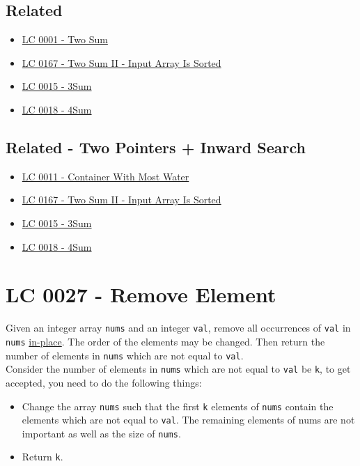 \subsection*{Related}
\begin{itemize}
\item \hyperref[lc0001]{LC 0001 - Two Sum}
\item \hyperref[lc0167]{LC 0167 - Two Sum II - Input Array Is Sorted}
\item \hyperref[lc0015]{LC 0015 - 3Sum}
\item \hyperref[lc0018]{LC 0018 - 4Sum}
\end{itemize}

\subsection*{Related - Two Pointers + Inward Search}
\begin{itemize}
\item \hyperref[lc0011]{LC 0011 - Container With Most Water}
\item \hyperref[lc0167]{LC 0167 - Two Sum II - Input Array Is Sorted}
\item \hyperref[lc0015]{LC 0015 - 3Sum}
\item \hyperref[lc0018]{LC 0018 - 4Sum}
\end{itemize}

\section{LC 0027 - Remove Element}\label{lc0027}
Given an integer array {\colorbox{CodeBackground}{\lstinline|nums|}} and an integer {\colorbox{CodeBackground}{\lstinline|val|}}, remove all occurrences of {\colorbox{CodeBackground}{\lstinline|val|}} in {\colorbox{CodeBackground}{\lstinline|nums|}} \ul{in-place}. The order of the elements may be changed. Then return the number of elements in {\colorbox{CodeBackground}{\lstinline|nums|}} which are not equal to {\colorbox{CodeBackground}{\lstinline|val|}}.\\

Consider the number of elements in {\colorbox{CodeBackground}{\lstinline|nums|}} which are not equal to {\colorbox{CodeBackground}{\lstinline|val|}} be {\colorbox{CodeBackground}{\lstinline|k|}}, to get accepted, you need to do the following things:
\begin{itemize}
	\item Change the array {\colorbox{CodeBackground}{\lstinline|nums|}} such that the first {\colorbox{CodeBackground}{\lstinline|k|}} elements of {\colorbox{CodeBackground}{\lstinline|nums|}} contain the elements which are not equal to {\colorbox{CodeBackground}{\lstinline|val|}}. The remaining elements of nums are not important as well as the size of {\colorbox{CodeBackground}{\lstinline|nums|}}.
	\item Return {\colorbox{CodeBackground}{\lstinline|k|}}.
\end{itemize}

